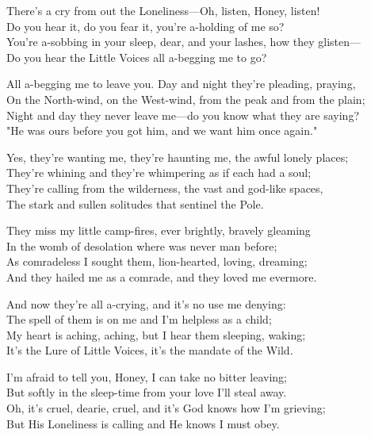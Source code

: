 
\begin{poemblock}
There's a cry from out the Loneliness—Oh, listen, Honey, listen!\\
\idt Do you hear it, do you fear it, you're a-holding of me so?\\
You're a-sobbing in your sleep, dear, and your lashes, how they glisten—\\
\idt Do you hear the Little Voices all a-begging me to go?

All a-begging me to leave you. Day and night they're pleading, praying,\\
\idt On the North-wind, on the West-wind, from the peak and from the plain;\\
Night and day they never leave me—do you know what they are saying?\\
\idt "He was ours before you got him, and we want him once again."

Yes, they're wanting me, they're haunting me, the awful lonely places;\\
\idt They're whining and they're whimpering as if each had a soul;\\
They're calling from the wilderness, the vast and god-like spaces,\\
\idt The stark and sullen solitudes that sentinel the Pole.

They miss my little camp-fires, ever brightly, bravely gleaming\\
\idt In the womb of desolation where was never man before;\\
As comradeless I sought them, lion-hearted, loving, dreaming;\\
\idt And they hailed me as a comrade, and they loved me evermore.

And now they're all a-crying, and it's no use me denying:\\
\idt The spell of them is on me and I'm helpless as a child;\\
My heart is aching, aching, but I hear them sleeping, waking;\\
\idt It's the Lure of Little Voices, it's the mandate of the Wild.

I'm afraid to tell you, Honey, I can take no bitter leaving;\\
\idt But softly in the sleep-time from your love I'll steal away.\\
Oh, it's cruel, dearie, cruel, and it's God knows how I'm grieving;\\
\idt But His Loneliness is calling and He knows I must obey.
\end{poemblock}
